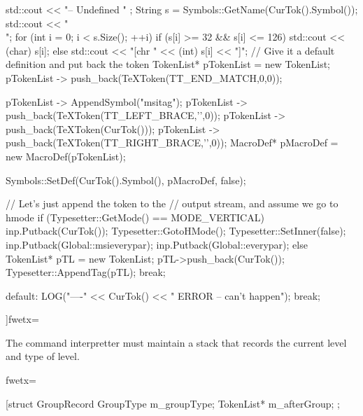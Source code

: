 {{{{{        std::cout << "\n-- Undefined " ;
        String s = Symbols::GetName(CurTok().Symbol());
        std::cout << "\\";
        for (int i = 0; i < s.Size(); ++i){
          if (s[i] >= 32 && s[i] <= 126){
             std::cout << (char) s[i];
          } else {
             std::cout << "[chr " << (int) s[i] << "]";
          }
        }
        // Give it a default definition and put back the token
        TokenList* pTokenList = new TokenList;
        pTokenList -> push_back(TeXToken(TT_END_MATCH,0,0));

        pTokenList -> AppendSymbol("msitag");
        pTokenList -> push_back(TeXToken(TT_LEFT_BRACE,'{',0));
        pTokenList -> push_back(TeXToken(CurTok()));
        pTokenList -> push_back(TeXToken(TT_RIGHT_BRACE,'}',0));
        MacroDef* pMacroDef = new MacroDef(pTokenList);

        Symbols::SetDef(CurTok().Symbol(), pMacroDef, false);

        // Let's just append the token to the
        // output stream, and assume we go to hmode
        if (Typesetter::GetMode() == MODE_VERTICAL){
           inp.Putback(CurTok());
           Typesetter::GotoHMode();
           Typesetter::SetInner(false);
           inp.Putback(Global::msieverypar);
           inp.Putback(Global::everypar);
        } else {
           TokenList* pTL = new TokenList;
           pTL->push_back(CurTok());
           Typesetter::AppendTag(pTL);
        }
        break;
      }
      default:
        LOG("\n----" << CurTok()
                     << " ERROR -- can't happen");
        break;
   }
]fwetx=%
\fwcdef 
\fwbeginmacronotes
{}
\fwendmacronotes
\fwendmacro




The command interpretter must maintain a stack that records the current
level and type of level.

\fwbeginmacro
{}\fwplusequals \fwodef {}fwetx=%
\fwcdef 
\fwbeginmacronotes
{}
\fwendmacronotes
\fwendmacro


\fwbeginmacro
{}\fwplusequals \fwodef \fwbtx[struct GroupRecord {
   GroupType  m_groupType;
   TokenList* m_afterGroup;
};

}}}

